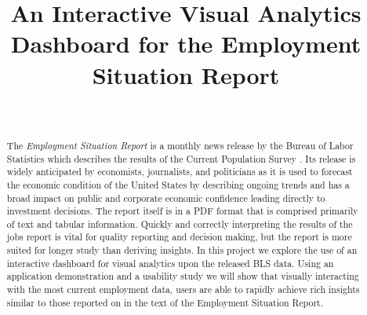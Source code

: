 \documentclass{sigchi}
\begin{document}
\title{An Interactive Visual Analytics Dashboard for the Employment Situation Report}


\author{%
    \\
}

\maketitle

\begin{abstract}
The \textit{Employment Situation Report} is a monthly news release by the Bureau of Labor Statistics which describes the results of the Current Population Survey \cite{_employment_2015}. Its release is widely anticipated by economists, journalists, and politicians as it is used to forecast the economic condition of the United States by describing ongoing trends and has a broad impact on public and corporate economic confidence leading directly to investment decisions. The report itself is in a PDF format that is comprised primarily of text and tabular information. Quickly and correctly interpreting the results of the jobs report is vital for quality reporting and decision making, but the report is more suited for longer study than deriving insights. In this project we explore the use of an interactive dashboard for visual analytics upon the released BLS data. Using an application demonstration and a usability study we will show that visually interacting with the most current employment data, users are able to rapidly achieve rich insights similar to those reported on in the text of the Employment Situation Report.
\end{abstract}
\end{document}
